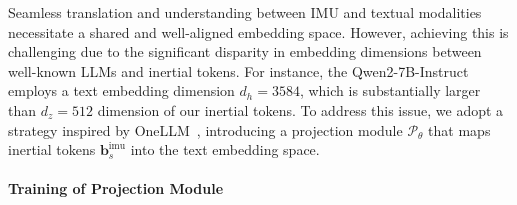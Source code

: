 Seamless translation and understanding between IMU and textual modalities necessitate a shared and well-aligned embedding space. However, achieving this is challenging due to the significant disparity in embedding dimensions between well-known LLMs and inertial tokens. For instance, the Qwen2-7B-Instruct~\cite{yang2024qwen2} employs a text embedding dimension $d_h=3584$, which is substantially larger than $d_z=512$ dimension of our inertial tokens. To address this issue, we adopt a strategy inspired by OneLLM~\cite{han2024onellm}, introducing a projection module $\mathcal{P}_{\theta}$ that maps inertial tokens $\mathbf{b}_s^{\textrm{imu}}$ into the text embedding space.


\vspace{-4mm}
\paragraph{Training of Projection Module} 

